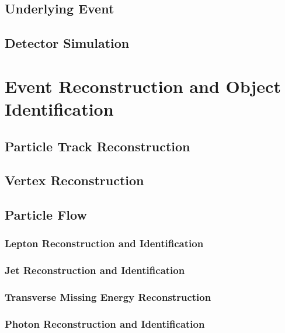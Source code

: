 \subsection{Underlying Event}

\subsection{Detector Simulation}

\section{Event Reconstruction and Object Identification}

\subsection{Particle Track Reconstruction}

\subsection{Vertex Reconstruction}

\subsection{Particle Flow}

\subsubsection{Lepton Reconstruction and Identification}

\subsubsection{Jet Reconstruction and Identification}

\subsubsection{Transverse Missing Energy Reconstruction}

\subsubsection{Photon Reconstruction and Identification}

